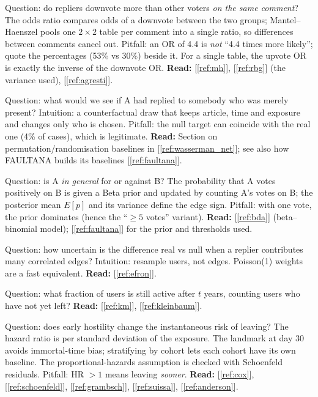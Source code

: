 \documentclass[11pt,a4paper]{article}
\newcommand{\readref}[1]{\textcolor{blue!50!black}{\textbf{Read:}} #1}
\begin{document}
\begin{description}[leftmargin=0pt,style=nextline]
\item[Odds ratio and Mantel--Haenszel (H1).]
Question: do repliers downvote more than other voters \emph{on the same comment}? The odds ratio compares odds of a downvote between the two groups; Mantel--Haenszel pools one $2\times2$ table per comment into a single ratio, so differences between comments cancel out. Pitfall: an OR of 4.4 is \emph{not} ``4.4 times more likely''; quote the percentages (53\% vs 30\%) beside it. For a single table, the upvote OR is exactly the inverse of the downvote OR. \readref{[\ref{ref:mh}], [\ref{ref:rbg}] (the variance used), [\ref{ref:agresti}].}

\item[Null model (H2, H3).]
Question: what would we see if A had replied to somebody who was merely present? Intuition: a counterfactual draw that keeps article, time and exposure and changes only who is chosen. Pitfall: the null target can coincide with the real one (4\% of cases), which is legitimate. \readref{Section on permutation/randomisation baselines in [\ref{ref:wasserman_net}]; see also how FAULTANA builds its baselines [\ref{ref:faultana}].}

\item[Beta posterior for a pair (H2).]
Question: is A \emph{in general} for or against B? The probability that A votes positively on B is given a Beta prior and updated by counting A's votes on B; the posterior mean $E[p]$ and its variance define the edge sign. Pitfall: with one vote, the prior dominates (hence the ``$\ge5$ votes'' variant). \readref{[\ref{ref:bda}] (beta--binomial model); [\ref{ref:faultana}] for the prior and thresholds used.}

\item[Bootstrap clustered by replier.]
Question: how uncertain is the difference real vs null when a replier contributes many correlated edges? Intuition: resample users, not edges. Poisson(1) weights are a fast equivalent. \readref{[\ref{ref:efron}].}

\item[Kaplan--Meier and censoring (lifetime).]
Question: what fraction of users is still active after $t$ years, counting users who have not yet left? \readref{[\ref{ref:km}], [\ref{ref:kleinbaum}].}

\item[Cox proportional hazards, landmark, stratification (H4).]
Question: does early hostility change the instantaneous risk of leaving? The hazard ratio is per standard deviation of the exposure. The landmark at day 30 avoids immortal-time bias; stratifying by cohort lets each cohort have its own baseline. The proportional-hazards assumption is checked with Schoenfeld residuals. Pitfall: HR $>1$ means leaving \emph{sooner}. \readref{[\ref{ref:cox}], [\ref{ref:schoenfeld}], [\ref{ref:grambsch}], [\ref{ref:suissa}], [\ref{ref:anderson}].}


\end{description}
\end{document}
